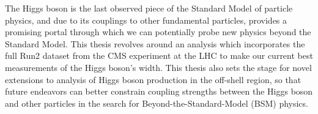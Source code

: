 

The Higgs boson is the last observed piece of the Standard Model of particle physics, and due to its couplings to other fundamental particles, provides a promising portal through which we can potentially probe new physics beyond the Standard Model. This thesis revolves around an analysis which incorporates the full Run2 dataset from the CMS experiment at the LHC to make our current best measurements of the Higgs boson's width. This thesis also sets the stage for novel extensions to analysis of Higgs boson production in the off-shell region, so that future endeavors can better constrain coupling strengths between the Higgs boson and other particles in the search for Beyond-the-Standard-Model (BSM) physics. 



